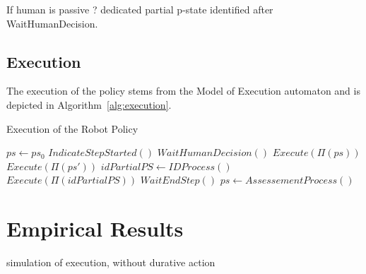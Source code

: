 
If human is passive ? dedicated partial p-state identified after WaitHumanDecision.

    \subsection{Execution}

The execution of the policy stems from the Model of Execution automaton and is depicted in Algorithm~\ref{alg:execution}.

\begin{algorithm}
\caption{Execution of the Robot Policy }\label{alg:execution}
\begin{algorithmic}[1]

\State $ps \gets ps_0$ 
    \State $IndicateStepStarted()$ 
    \State $WaitHumanDecision()$
     
        \State $Execute(\Pi(ps))$
    \Else
         
            \State $Execute(\Pi(ps'))$
        \Else
            \State $idPartialPS \gets IDProcess()$ 
            \State $Execute(\Pi(idPartialPS))$
        \EndIf
    \EndIf
    \State $WaitEndStep()$ 
    \State $ps \gets AssessementProcess()$ 
\EndWhile

\end{algorithmic}
\end{algorithm}

\section{Empirical Results}
simulation of execution, without durative action

